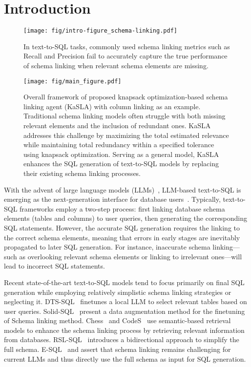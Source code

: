 \section{Introduction}
\label{sec:introduction}

\begin{figure}[!h]
	\centering
        \texttt{[image: fig/intro-figure\_schema-linking.pdf]}
        \caption{In text-to-SQL tasks, commonly used schema linking metrics such as Recall and Precision fail to accurately capture the true performance of schema linking when relevant schema elements are missing.} 
        \label{fig:motivation}
\end{figure}

\begin{figure*}[!h]
	\centering
        \texttt{[image: fig/main\_figure.pdf]}
        \caption{Overall framework of proposed knapsack optimization-based schema linking agent (KaSLA) with column linking as an example. Traditional schema linking models often struggle with both missing relevant elements and the inclusion of redundant ones. KaSLA addresses this challenge by maximizing the total estimated relevance while maintaining total redundancy within a specified tolerance using knapsack optimization. Serving as a general model, KaSLA enhances the SQL generation of text-to-SQL models by replacing their existing schema linking processes.} 
        \label{fig: KaSLA main figure}
\end{figure*}


With the advent of large language models (LLMs)~\citep{achiam2023gpt,dubey2024llama3}, LLM-based text-to-SQL is emerging as the next-generation interface for database users~\citep{hong2024next}. Typically, text-to-SQL frameworks employ a two-step process: first linking database schema elements (tables and columns) to user queries, then generating the corresponding SQL statements. However, the accurate SQL generation requires the linking to the correct schema elements, meaning that errors in early stages are inevitably propagated to later SQL generation. For instance, inaccurate schema linking---such as overlooking relevant schema elements or linking to irrelevant ones---will lead to incorrect SQL statements.

Recent state-of-the-art text-to-SQL models tend to focus primarily on final SQL generation while employing relatively simplistic schema linking strategies or neglecting it.
DTS-SQL~\citep{pourreza2024dtssql} finetunes a local LLM to select relevant tables based on user queries. Solid-SQL~\citep{liu-etal-2025-solid} present a data augmentation method for the finetuning of Schema linking method. Chess~\citep{talaei2024chess} and CodeS~\citep{li2024codes} use semantic-based retrieval models to enhance the schema linking process by retrieving relevant information from databases. RSL-SQL~\citep{cao2024rsl} introduces a bidirectional approach to simplify the full schema. E-SQL~\citep{qu2024before} and \citep{maamari2024death} assert that schema linking remains challenging for current LLMs and thus directly use the full schema as input for SQL generation.

